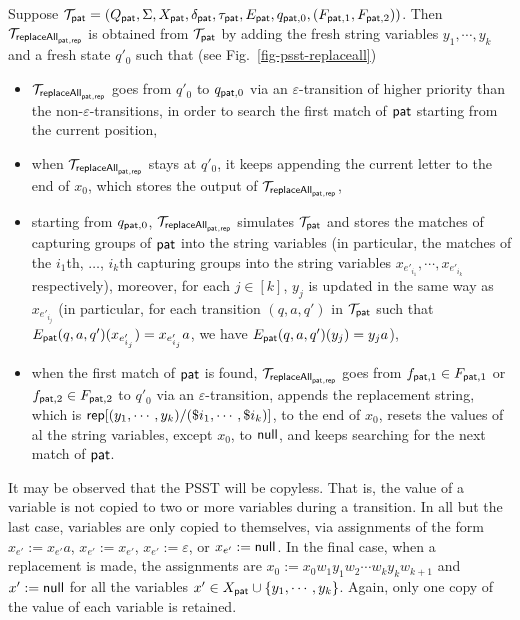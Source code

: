  Suppose $\mathcal{T}_{\mathsf{pat}} = (Q_{\mathsf{pat}}, \Sigma, X_{\mathsf{pat}}, \delta_{\mathsf{pat}}, \tau_{\mathsf{pat}}, E_{\mathsf{pat}}, q_{\mathsf{pat},0}, (F_{\mathsf{pat},1}, F_{\mathsf{pat},2}))$.
Then $\mathcal{T}_{\mathsf{replaceAll}_{\mathsf{pat},\mathsf{rep}}}$ is obtained from $\mathcal{T}_{\mathsf{pat}}$ by adding the fresh string variables $y_1, \cdots, y_k$ and a fresh state $q'_0$ such that (see Fig.~\ref{fig-psst-replaceall})
\begin{itemize}
    \item $\mathcal{T}_{\mathsf{replaceAll}_{\mathsf{pat},\mathsf{rep}}}$ goes from $q'_0$ to $q_{\mathsf{pat},0}$ via an $\varepsilon$-transition of higher priority than the non-$\varepsilon$-transitions, in order to search the first match of $\mathsf{pat}$ starting from the current position,
    \item when $\mathcal{T}_{\mathsf{replaceAll}_{\mathsf{pat},\mathsf{rep}}}$ stays at $q'_0$, it keeps appending the current letter to the end of $x_0$, which stores the output of $\mathcal{T}_{\mathsf{replaceAll}_{\mathsf{pat},\mathsf{rep}}}$,
    \item starting from $q_{\mathsf{pat}, 0}$, $\mathcal{T}_{\mathsf{replaceAll}_{\mathsf{pat},\mathsf{rep}}}$ simulates $\mathcal{T}_{\mathsf{pat}}$ and stores the matches of capturing groups of $\mathsf{pat}$ into the string variables (in particular,
    the matches of the $i_1$th, $\ldots$, $i_k$th capturing groups into the string variables $x_{e'_{i_1}}, \cdots, x_{e'_{i_k}}$ respectively), moreover, for each $j \in [k]$, $y_j$ is updated in the same way as $x_{e'_{i_j}}$ (in particular, for each transition $(q, a, q')$ in $\mathcal{T}_{\mathsf{pat}}$ such that $E_{\mathsf{pat}}(q, a, q')(x_{e'_{i_j}}) = x_{e'_{i_j}} a$,  we have $E_{\mathsf{pat}}(q, a, q')(y_j) = y_j a$),

    \item when the first match of $\mathsf{pat}$ is found, $\mathcal{T}_{\mathsf{replaceAll}_{\mathsf{pat},\mathsf{rep}}}$ goes from $f_{\mathsf{pat},1} \in F_{\mathsf{pat}, 1}$ or $f_{\mathsf{pat}, 2} \in F_{\mathsf{pat}, 2}$ to $q'_0$ via an $\varepsilon$-transition, appends the replacement string, which is $\mathsf{rep}[(y_1, \cdots, y_k)/(\$i_1,\cdots, \$i_k)]$, to the end of $x_0$, resets the values of al the string variables, except $x_0$, to $\mathsf{null}$, and keeps searching for the next match of $\mathsf{pat}$.
\end{itemize}

It may be observed that the PSST will be copyless.
That is, the value of a variable is not copied to two or more variables during a transition.
In all but the last case, variables are only copied to themselves, via assignments of the form $x_{e'} := x_{e'} a$, $x_{e'} := x_{e'}$, $x_{e'} := \varepsilon$, or $x_{e'} := \mathsf{null}$.
In the final case, when a replacement is made, the assignments are
$x_0 := x_0 w_1y_1 w_2 \cdots w_k y_k w_{k+1}$
and
$x^\prime := \mathsf{null}$ for all the variables $x^\prime \in X_{\mathsf{pat}} \cup \{y_1, \cdots, y_k\}$.
Again, only one copy of the value of each variable is retained.

